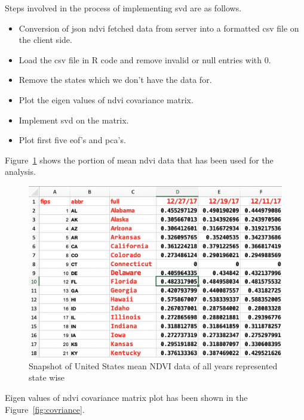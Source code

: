 Steps involved in the process of implementing \gls{svd} are as follows.

\begin{itemize}
    \item Conversion of \gls{json} \gls{ndvi} fetched data from server into a formatted \gls{csv} file on the client side.
    \item Load the csv file in R code and remove invalid or null entries with 0.
    \item Remove the states which we don't have the data for.
    \item Plot the eigen values of \gls{ndvi} covariance matrix.
    \item Implement \gls{svd} on the matrix.
    \item Plot first five \gls{eof}'s and \gls{pca}'s.
\end{itemize}

Figure~\ref{fig:svd_data_snapshot} shows the portion of mean \gls{ndvi} data that has been used for the analysis.

  \begin{figure}[H]
            \centering
            \includegraphics[width=1.0\linewidth]{figures/ch5/svd_data_snapshot.png}
            \caption{\label{fig:svd_data_snapshot} Snapshot of United States mean NDVI data of all years represented state wise}
    \end{figure}
    
\newpage    
Eigen values of \gls{ndvi} covariance matrix plot has been shown in the Figure~\ref{fig:covriance}.

